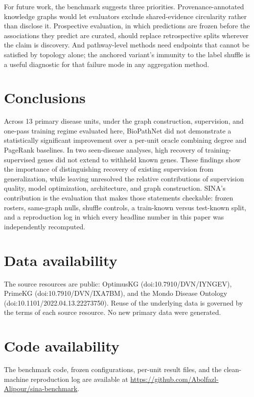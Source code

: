 \documentclass[11pt]{article}
\begin{document}
For future work, the benchmark suggests three priorities. Provenance-annotated knowledge graphs would let evaluators exclude shared-evidence circularity rather than disclose it. Prospective evaluation, in which predictions are frozen before the associations they predict are curated, should replace retrospective splits wherever the claim is discovery. And pathway-level methods need endpoints that cannot be satisfied by topology alone; the anchored variant's immunity to the label shuffle is a useful diagnostic for that failure mode in any aggregation method.

\section{Conclusions}

Across 13 primary disease units, under the graph construction, supervision, and one-pass training regime evaluated here, BioPathNet did not demonstrate a statistically significant improvement over a per-unit oracle combining degree and PageRank baselines. In two seen-disease analyses, high recovery of training-supervised genes did not extend to withheld known genes. These findings show the importance of distinguishing recovery of existing supervision from generalization, while leaving unresolved the relative contributions of supervision quality, model optimization, architecture, and graph construction. SINA's contribution is the evaluation that makes those statements checkable: frozen rosters, same-graph nulls, shuffle controls, a train-known versus test-known split, and a reproduction log in which every headline number in this paper was independently recomputed.

\section*{Data availability}
The source resources are public: OptimusKG (doi:10.7910/DVN/IYNGEV), PrimeKG (doi:10.7910/DVN/IXA7BM), and the Mondo Disease Ontology (doi:10.1101/2022.04.13.22273750). Reuse of the underlying data is governed by the terms of each source resource. No new primary data were generated.

\section*{Code availability}
The benchmark code, frozen configurations, per-unit result files, and the clean-machine reproduction log are available at \url{https://github.com/Abolfazl-Alipour/sina-benchmark}.
\end{document}

